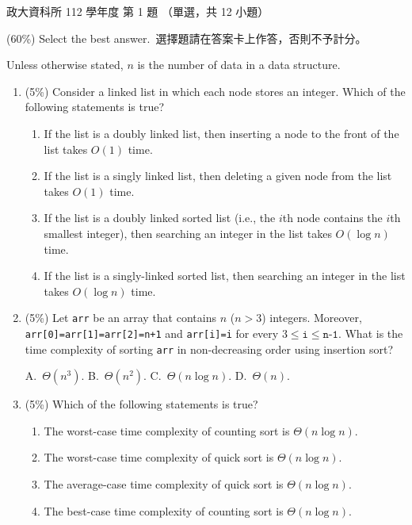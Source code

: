 \begin{pastexam}[label={px:nccu-112-dsa-01}]{政大資科所 112 學年度 第 1 題}
（單選，共 12 小題）

(60\%) Select the best answer.\ 選擇題請在答案卡上作答，否則不予計分。

Unless otherwise stated, $n$ is the number of data in a data structure.
\begin{enumerate}[label=\arabic*),itemsep=2pt,topsep=2pt]
\item (5\%) Consider a linked list in which each node stores an integer. Which of the following
statements is true?
\begin{enumerate}[label=\Alph*.,itemsep=0pt,topsep=2pt]
\item If the list is a doubly linked list, then inserting a node to the front of the list takes $O(1)$ time.
\item If the list is a singly linked list, then deleting a given node from the list takes $O(1)$ time.
\item If the list is a doubly linked sorted list (i.e., the $i$th node contains the $i$th smallest
integer), then searching an integer in the list takes $O(\log n)$ time.
\item If the list is a singly-linked sorted list, then searching an integer in the list takes
$O(\log n)$ time.
\end{enumerate}

\item (5\%) Let \texttt{arr} be an array that contains $n$ ($n>3$) integers. Moreover,
\texttt{arr[0]=arr[1]=arr[2]=n+1} and \texttt{arr[i]=i} for every $3\le \texttt{i} \le \texttt{n-1}$.
What is the time complexity of sorting \texttt{arr} in non-decreasing order using insertion sort?

A.~$\Theta(n^3)$. \qquad B.~$\Theta(n^2)$. \qquad C.~$\Theta(n\log n)$. \qquad D.~$\Theta(n)$.

\item (5\%) Which of the following statements is true?
\begin{enumerate}[label=\Alph*.,itemsep=0pt,topsep=2pt]
\item The worst-case time complexity of counting sort is $\Theta(n\log n)$.
\item The worst-case time complexity of quick sort is $\Theta(n\log n)$.
\item The average-case time complexity of quick sort is $\Theta(n\log n)$.
\item The best-case time complexity of counting sort is $\Theta(n\log n)$.
\end{enumerate}


\end{enumerate}
\end{pastexam}
